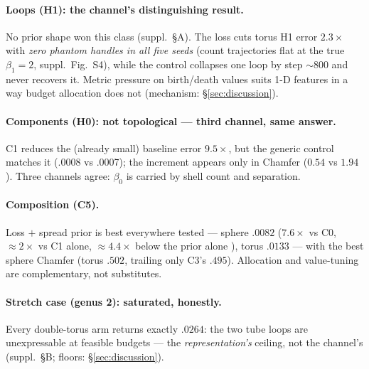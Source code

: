 \paragraph{Loops (H1): the channel's distinguishing result.} No prior
shape won this class (suppl.\ \S A). The loss cuts torus
H1 error $2.3\times$ with \emph{zero phantom handles in all five seeds}
(count trajectories flat at the true $\beta_1{=}2$,
suppl.\ Fig.~S4), while the control collapses one loop by step
${\sim}800$ and never recovers it. Metric pressure
on birth/death values suits 1-D features in a way budget allocation does
not (mechanism: \S\ref{sec:discussion}).

\paragraph{Components (H0): not topological --- third channel, same answer.}
C1 reduces the (already small) baseline error $9.5\times$, but the
generic control matches it (.0008 vs .0007); the increment appears only
in Chamfer ($0.54$ vs $1.94$). Three channels agree: $\beta_0$ is
carried by shell count and separation.

\paragraph{Composition (C5).} Loss $+$ spread prior is best everywhere
tested --- sphere $.0082$ ($7.6\times$ vs C0, ${\approx}2\times$ vs C1 alone,
${\approx}4.4\times$ below the prior alone
), torus $.0133$ --- with the best sphere Chamfer (torus $.502$,
trailing only C3's $.495$). Allocation and value-tuning are
complementary, not substitutes.

\paragraph{Stretch case (genus 2): saturated, honestly.} Every double-torus
arm returns exactly $.0264$: the two tube loops are unexpressable at
feasible budgets --- the \emph{representation's} ceiling, not the
channel's (suppl.\ \S B; floors: \S\ref{sec:discussion}).

